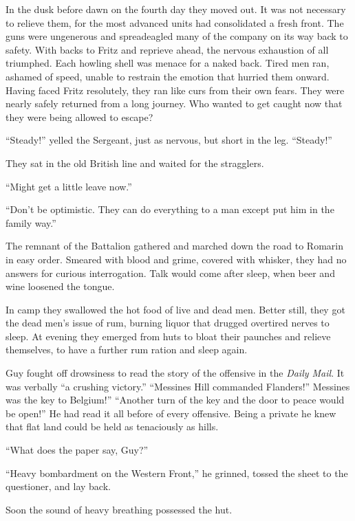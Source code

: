 In the dusk before dawn on the fourth day they moved out. It was not necessary to relieve them, for the most advanced units had consolidated a fresh front. The guns were ungenerous and spreadeagled many of the company on its way back to safety. With backs to Fritz and reprieve ahead, the nervous exhaustion of all triumphed. Each howling shell was menace for a naked back. Tired men ran, ashamed of speed, unable to restrain the emotion that hurried them onward. Having faced Fritz resolutely, they ran like curs from their own fears. They were nearly safely returned from a long journey. Who wanted to get caught now that they were being allowed to escape?

``Steady!'' yelled the Sergeant, just as nervous, but short in the leg. ``Steady!''

They sat in the old British line and waited for the stragglers.

``Might get a little leave now.''

``Don't be optimistic. They can do everything to a man except put him in the family way.''

The remnant of the Battalion gathered and marched down the road to Romarin in easy order. Smeared with blood and grime, covered with whisker, they had no answers for curious interrogation. Talk would come after sleep, when beer and wine loosened the tongue.

In camp they swallowed the hot food of live and dead men. Better still, they got the dead men's issue of rum, burning liquor that drugged overtired nerves to sleep. At evening they emerged from huts to bloat their paunches and relieve themselves, to have a further rum ration and sleep again.

Guy fought off drowsiness to read the story of the offensive in the \textit{Daily Mail}. It was verbally ``a crushing victory.'' ``Messines Hill commanded Flanders!'' Messines was the key to Belgium!'' ``Another turn of the key and the door to peace would be open!'' He had read it all before of every offensive. Being a private he knew that flat land could be held as tenaciously as hills.

``What does the paper say, Guy?''

``Heavy bombardment on the Western Front,'' he grinned, tossed the sheet to the questioner, and lay back.

Soon the sound of heavy breathing possessed the hut.


